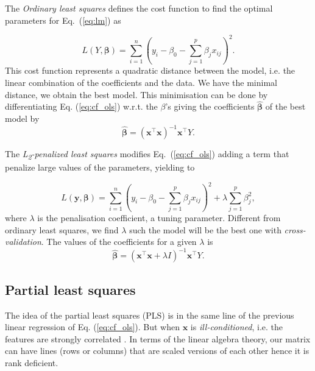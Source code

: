 \documentclass[conference]{IEEEtran}
\begin{document}
The \emph{Ordinary least squares} defines the cost function to find the optimal parameters for Eq.~(\ref{eq:lm}) as

\begin{equation}\label{eq:cf_ols}
  L(Y, \boldsymbol{\beta}) =\sum_{i=1}^{n}\left(y_{i}-\beta_{0}-\sum_{j=1}^{p} \beta_{j} x_{i j}\right)^{2}.
\end{equation}
%
This cost function represents a quadratic distance between the model, i.e. the linear combination of the coefficients and the data. We have the minimal distance, we obtain the best model. This minimisation can be done by differentiating Eq. (\ref{eq:cf_ols}) w.r.t. the $\beta$'s giving the coefficients $\hat{\boldsymbol{\beta}}$ of the best model by
%
\[
\hat{\boldsymbol{\beta}} = (\mathbf{x}^\top\mathbf{x})^{-1}\mathbf{x}^\top Y.
\]

The \emph{L\textsubscript{2}-penalized least squares} modifies Eq.~(\ref{eq:cf_ols}) adding a term that penalize large values of the parameters, yielding to

\begin{equation}
  L(\mathbf{y}, \boldsymbol{\beta}) = \sum_{i=1}^{n}\left(y_{i}-\beta_{0}-\sum_{j=1}^{p} \beta_{j} x_{i j}\right)^{2}+\lambda \sum_{j=1}^{p} \beta_{j}^{2},
\end{equation}
%
where $\lambda$ is the penalisation coefficient, a tuning parameter. Different from ordinary least squares, we find $\lambda$ such the model will be the best one with \emph{cross-validation}. The values of the coefficients for a given $\lambda$ is 
%
\[
\hat{\boldsymbol{\beta}} = (\mathbf{x}^\top\mathbf{x} + \lambda I)^{-1}\mathbf{x}^\top Y.
\]

\subsection{Partial least squares}

The idea of the partial least squares (PLS) is in the same line of the previous linear regression of Eq. (\ref{eq:cf_ols}). But when $\mathbf{x}$ is \emph{ill-conditioned}, i.e. the features are strongly correlated \cite{b7}. In terms of the linear algebra theory, our matrix can have lines (rows or columns) that are scaled versions of each other hence it is rank deficient.
\end{document}
